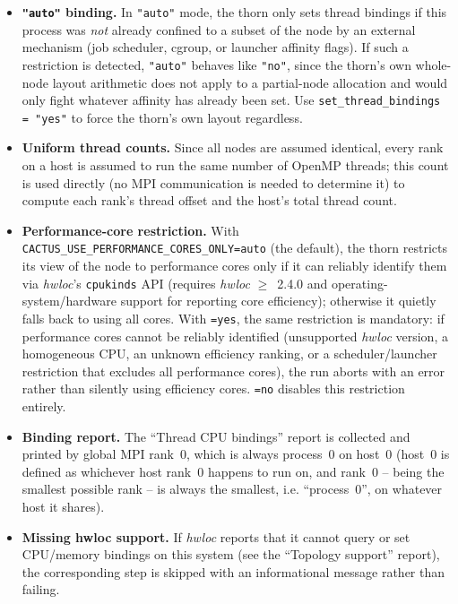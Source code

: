 \begin{itemize}
\item \textbf{\texttt{"auto"} binding.} In \texttt{"auto"} mode, the
  thorn only sets thread bindings if this process was \emph{not}
  already confined to a subset of the node by an external mechanism
  (job scheduler, cgroup, or launcher affinity flags). If such a
  restriction is detected, \texttt{"auto"} behaves like \texttt{"no"},
  since the thorn's own whole-node layout arithmetic does not apply to
  a partial-node allocation and would only fight whatever affinity has
  already been set. Use \texttt{set\_thread\_bindings = "yes"} to
  force the thorn's own layout regardless.
\item \textbf{Uniform thread counts.} Since all nodes are assumed
  identical, every rank on a host is assumed to run the same number of
  OpenMP threads; this count is used directly (no MPI communication is
  needed to determine it) to compute each rank's thread offset and the
  host's total thread count.
\item \textbf{Performance-core restriction.} With
  \texttt{CACTUS\_USE\_PERFORMANCE\_CORES\_ONLY=auto} (the default), the
  thorn restricts its view of the node to performance cores only if it
  can reliably identify them via \emph{hwloc}'s \texttt{cpukinds} API
  (requires \emph{hwloc} $\geq$~2.4.0 and operating-system/hardware
  support for reporting core efficiency); otherwise it quietly falls
  back to using all cores. With \texttt{=yes}, the same restriction is
  mandatory: if performance cores cannot be reliably identified
  (unsupported \emph{hwloc} version, a homogeneous CPU, an unknown
  efficiency ranking, or a scheduler/launcher restriction that excludes
  all performance cores), the run aborts with an error rather than
  silently using efficiency cores. \texttt{=no} disables this
  restriction entirely.
\item \textbf{Binding report.} The ``Thread CPU bindings'' report is
  collected and printed by global MPI rank~0, which is always process~0
  on host~0 (host~0 is defined as whichever host rank~0 happens to run
  on, and rank~0 -- being the smallest possible rank -- is always the
  smallest, i.e. ``process~0'', on whatever host it shares).
\item \textbf{Missing hwloc support.} If \emph{hwloc} reports that it
  cannot query or set CPU/memory bindings on this system (see the
  ``Topology support'' report), the corresponding step is skipped with
  an informational message rather than failing.
\end{itemize}

